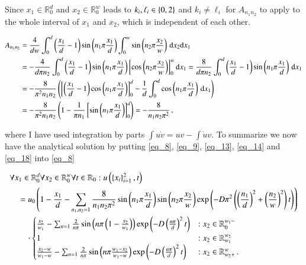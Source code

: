 \documentclass[11pt,english,a4paper]{article}
\begin{document}
\begin{flushleft}
Since $x_1\in\mathbb{R}_0^d$ and $x_2\in\mathbb{R}_0^w$ leads to $k_i,\ell_i \in \left\lbrace{0,2}\right\rbrace$ and $k_i\neq \ell_i$ for $A_{n_1 n_2}$ to apply to the whole interval of $x_1$ and $x_2$, which is independent of each other.

\begin{align}
A_{n_1 n_2} &=  \frac{4}{dw}\int_{0}^{d}\left({\frac{x_1}{d}-1}\right)\sin\left({n_1\pi\frac{x_1}{d}}\right)\int_{0}^{w} \sin\left({n_2\pi\frac{x_2}{w}}\right)\,\mathrm{d}x_2\mathrm{d}x_1 
\nonumber\\
&= -\frac{4}{d\pi n_2}\int_{0}^{d}\left({\frac{x_1}{d}-1}\right)\sin\left({n_1\pi\frac{x_1}{d}}\right)\left[{ \cos\left({n_2\pi\frac{x_2}{w}}\right)}\right]_{0}^{w}\mathrm{d}x_1 
= \frac{8}{d\pi n_2}\int_{0}^{d}\left({\frac{x_1}{d}-1}\right)\sin\left({n_1\pi\frac{x_1}{d}}\right)\,\mathrm{d}x_1 
\nonumber\\
&= -\frac{8}{\pi^2 n_1 n_2}\left({\left[{\left({\frac{x_1}{d}-1}\right)\cos\left({n_1\pi\frac{x_1}{d}}\right)}\right]_0^d - \frac{1}{d}\int_{0}^{d}\cos\left({n_1\pi\frac{x_1}{d}}\right)\,\mathrm{d}x_1}\right)
\nonumber\\
&= -\frac{8}{\pi^2 n_1 n_2}\left({1 - \frac{1}{\pi n_1}\left[{\sin\left({n_1\pi\frac{x_1}{d}}\right)}\right]_0^d}\right)
= -\frac{8}{n_1 n_2 \pi^2} \,,
\label{eq_18}
\end{align}

where I have used integration by parts $\int u\dot{v} = uv - \int \dot{u}v$. To summarize we now have the analytical solution by putting \eqref{eq_8}, \eqref{eq_9}, \eqref{eq_13}, \eqref{eq_14} and \eqref{eq_18} into \eqref{eq_8}

\begin{align}
&\forall x_1 \in \mathbb{R}_0^d \forall x_2 \in \mathbb{R}_0^w \forall t \in \mathbb{R}_{0}: u\left({\left\lbrace{x_i}\right\rbrace_{i=1}^2,t}\right) 
\nonumber\\
&\quad = u_0\left({1-\frac{x_1}{d}-\sum_{n_1,n_2=1} \frac{8}{n_1 n_2 \pi^2}\sin\left({n_1\pi \frac{x_1}{d}}\right) \sin\left({n_2\pi \frac{x_2}{w}}\right) \exp\left({-D\pi^2\left({\left({\frac{n_1}{d}}\right)^2 + \left({\frac{n_2}{w}}\right)^2}\right) t}\right)}\right)
\nonumber\\
&\qquad \cdot \begin{cases} \frac{x_2}{w_1} - \sum_{n=1} \frac{2}{n \pi} \sin\left({n\pi\left({1-\frac{x_2}{w_1}}\right)}\right)\exp\left({-D\left({\frac{n\pi}{d}}\right)^2 t}\right) &: x_2\in\mathbb{R}_0^{w_1-}\\ 1 &: x_2 \in\mathbb{R}_{w_1}^{w_2} \\  \frac{x_2-w}{w_1-w} - \sum_{n=1} \frac{2}{n \pi} \sin\left({n\pi\frac{w_1-x_2}{w_1-w}}\right)\exp\left({-D\left({\frac{n\pi}{d}}\right)^2 t}\right) & : x_2\in\mathbb{R}_{w_2+}^w \,.\end{cases}
\label{eq_19}
\end{align}



\end{flushleft}
\end{document}
